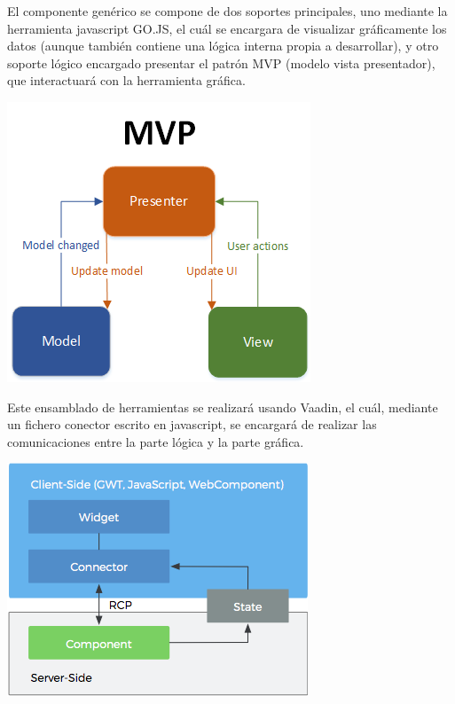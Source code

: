 \documentclass[a4paper,12pt]{article}
\begin{document}
	El componente genérico se compone de dos soportes principales, uno mediante la herramienta javascript GO.JS, el cuál se encargara de visualizar gráficamente los datos (aunque también contiene una lógica interna propia a desarrollar), y otro soporte lógico encargado presentar el patrón MVP (modelo vista presentador), que interactuará con la herramienta gráfica.\\
	
	\begin{center}
		\includegraphics{images/mvp}\\
	\end{center}
	
	
	Este ensamblado de herramientas se realizará usando Vaadin, el cuál, mediante un fichero conector escrito en javascript, se encargará de realizar las comunicaciones entre la parte lógica y la parte gráfica.\\
	
	
	\begin{center}
		\includegraphics{images/schema}\\
	\end{center}
	

	
\end{document}
